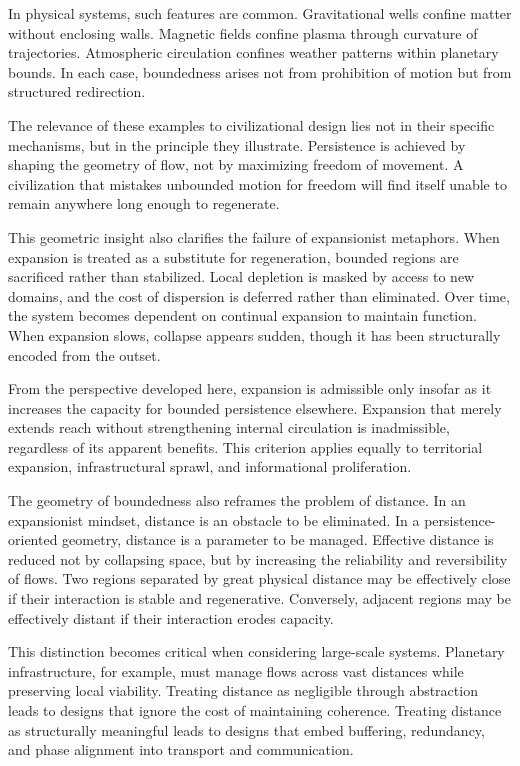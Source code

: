 \documentclass[12pt,oneside]{book}
\begin{document}
In physical systems, such features are common. Gravitational wells confine matter without enclosing walls. Magnetic fields confine plasma through curvature of trajectories. Atmospheric circulation confines weather patterns within planetary bounds. In each case, boundedness arises not from prohibition of motion but from structured redirection.

The relevance of these examples to civilizational design lies not in their specific mechanisms, but in the principle they illustrate. Persistence is achieved by shaping the geometry of flow, not by maximizing freedom of movement. A civilization that mistakes unbounded motion for freedom will find itself unable to remain anywhere long enough to regenerate.

This geometric insight also clarifies the failure of expansionist metaphors. When expansion is treated as a substitute for regeneration, bounded regions are sacrificed rather than stabilized. Local depletion is masked by access to new domains, and the cost of dispersion is deferred rather than eliminated. Over time, the system becomes dependent on continual expansion to maintain function. When expansion slows, collapse appears sudden, though it has been structurally encoded from the outset.

From the perspective developed here, expansion is admissible only insofar as it increases the capacity for bounded persistence elsewhere. Expansion that merely extends reach without strengthening internal circulation is inadmissible, regardless of its apparent benefits. This criterion applies equally to territorial expansion, infrastructural sprawl, and informational proliferation.

The geometry of boundedness also reframes the problem of distance. In an expansionist mindset, distance is an obstacle to be eliminated. In a persistence-oriented geometry, distance is a parameter to be managed. Effective distance is reduced not by collapsing space, but by increasing the reliability and reversibility of flows. Two regions separated by great physical distance may be effectively close if their interaction is stable and regenerative. Conversely, adjacent regions may be effectively distant if their interaction erodes capacity.

This distinction becomes critical when considering large-scale systems. Planetary infrastructure, for example, must manage flows across vast distances while preserving local viability. Treating distance as negligible through abstraction leads to designs that ignore the cost of maintaining coherence. Treating distance as structurally meaningful leads to designs that embed buffering, redundancy, and phase alignment into transport and communication.
\end{document}
